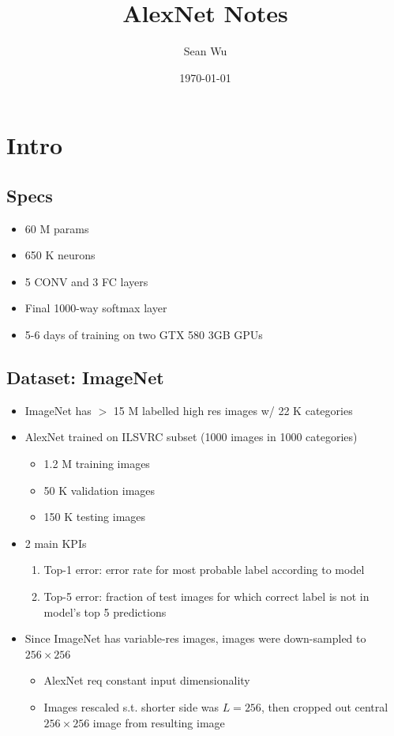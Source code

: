\documentclass[a4paper,12pt]{article}
\begin{document}
\title{AlexNet Notes}
\author{Sean Wu}
\date{\today}
\maketitle

\tableofcontents

\pagebreak

\setlength{\parindent}{0em}
\setlength{\parskip}{1em}

\section{Intro}

\subsection{Specs}
\begin{itemize}
  \item 60 M params
  \item 650 K neurons
  \item 5 CONV and 3 FC layers
  \item Final 1000-way softmax layer
  \item 5-6 days of training on two GTX 580 3GB GPUs
\end{itemize}

\subsection{Dataset: ImageNet}
\begin{itemize}
  \item ImageNet has $>$ 15 M labelled high res images w/ 22 K categories
  \item AlexNet trained on ILSVRC subset (1000 images in 1000 categories)
  \begin{itemize}
    \item 1.2 M training images
    \item 50 K validation images
    \item 150 K testing images
  \end{itemize}
  \item 2 main KPIs
  \begin{enumerate}
    \item Top-1 error: error rate for most probable label according to model
    \item Top-5 error: fraction of test images for which correct label is not in model's top 5 predictions
  \end{enumerate}
  \item Since ImageNet has variable-res images, images were down-sampled to $256\times 256$
  \begin{itemize}
    \item AlexNet req constant input dimensionality
    \item Images rescaled s.t. shorter side was $L = 256$, then cropped out central $256\times 256$ image from resulting image
  \end{itemize}
\end{itemize}
\end{document}
